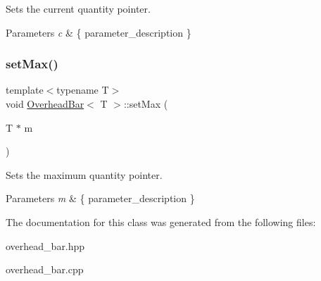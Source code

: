 Sets the current quantity pointer. 


\begin{DoxyParams}{Parameters}
{\em c} & \{ parameter\+\_\+description \} \\
\hline
\end{DoxyParams}
\mbox{\label{class_overhead_bar_a976c0bdb2b7a6d30c87aba6b2bdb18b9}} 
\subsubsection{\texorpdfstring{setMax()}{setMax()}}
{\footnotesize\ttfamily template$<$typename T$>$ \\
void \mbox{\hyperlink{class_overhead_bar}{Overhead\+Bar}}$<$ T $>$\+::set\+Max (\begin{DoxyParamCaption}\item[{T $\ast$}]{m }\end{DoxyParamCaption})\hspace{0.3cm}{\ttfamily [inline]}}



Sets the maximum quantity pointer. 


\begin{DoxyParams}{Parameters}
{\em m} & \{ parameter\+\_\+description \} \\
\hline
\end{DoxyParams}


The documentation for this class was generated from the following files\+:\begin{DoxyCompactItemize}
\item 
overhead\+\_\+bar.\+hpp\item 
overhead\+\_\+bar.\+cpp\end{DoxyCompactItemize}
